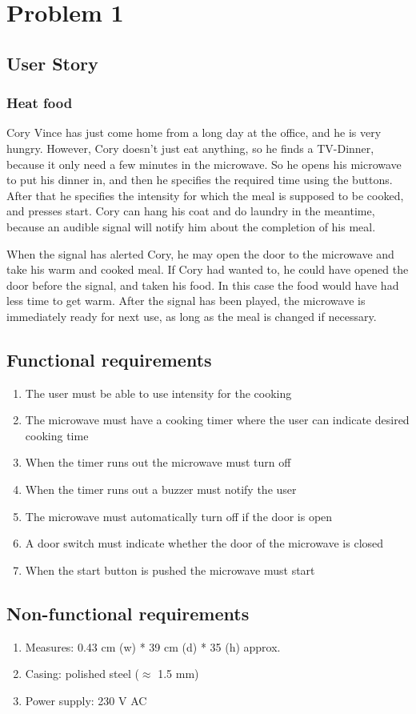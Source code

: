 \chapter{Problem 1}
\label{chp:intro}
\section{User Story}
\subsection{Heat food}
Cory Vince has just come home from a long day at the office, and he is very hungry. However, Cory doesn’t just eat anything, so he finds a TV-Dinner, because it only need a few minutes in the microwave. So he opens his microwave to put his dinner in, and then he specifies the required time using the buttons. After that he specifies the intensity for which the meal is supposed to be cooked, and presses start. Cory can hang his coat and do laundry in the meantime, because an audible signal will notify him about the completion of his meal.

When the signal has alerted Cory, he may open the door to the microwave and take his warm and cooked meal. If Cory had wanted to, he could have opened the door before the signal, and taken his food. In this case the food would have had less time to get warm. After the signal has been played, the microwave is immediately ready for next use, as long as the meal is changed if necessary.

\section{Functional requirements}

\begin{enumerate}[label=FR-\arabic*:]

\item The user must be able to use intensity for the cooking
\item The microwave must have a cooking timer where the user can indicate desired cooking time
\item When the timer runs out the microwave must turn off
\item When the timer runs out a buzzer must notify the user
\item The microwave must automatically turn off if the door is open
\item A door switch must indicate whether the door of the microwave is closed
\item When the start button is pushed the microwave must start

\end{enumerate}

\section{Non-functional requirements}

\begin{enumerate}[label=NFR-\arabic*:]
 \item Measures: 0.43 cm (w) * 39 cm (d) * 35 (h) approx.
 \item Casing: polished steel ($\approx$ 1.5 mm)
 \item Power supply: 230 V AC
\end{enumerate}
